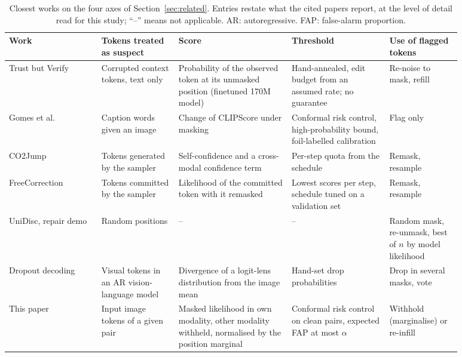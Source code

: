 \begin{table}[t]
\centering
\caption{Closest works on the four axes of Section~\ref{sec:related}. Entries restate what the cited papers report, at the
level of detail read for this study; ``--'' means not applicable. AR: autoregressive. FAP: false-alarm proportion.}
\label{tab:related}
\footnotesize
\setlength{\tabcolsep}{3pt}
\begin{tabular}{p{0.18\linewidth}p{0.15\linewidth}p{0.22\linewidth}p{0.19\linewidth}p{0.14\linewidth}}
\toprule
Work & Tokens treated as suspect & Score & Threshold & Use of flagged tokens \\
\midrule
Trust but Verify \cite{jhingran2026trustverify} & Corrupted context tokens, text only & Probability of the observed token at its unmasked position (finetuned 170M model) & Hand-annealed, edit budget from an assumed rate; no guarantee & Re-noise to mask, refill \\
Gomes et al.~\cite{gomes2025crc} & Caption words given an image & Change of CLIPScore under masking & Conformal risk control, high-probability bound, foil-labelled calibration & Flag only \\
CO2Jump \cite{le2026co2jump} & Tokens generated by the sampler & Self-confidence and a cross-modal confidence term & Per-step quota from the schedule & Remask, resample \\
FreeCorrection \cite{ouyang2026freecorrection} & Tokens committed by the sampler & Likelihood of the committed token with it remasked & Lowest scores per step, schedule tuned on a validation set & Remask, resample \\
UniDisc, repair demo~\cite{swerdlow2025unidisc} & Random positions & -- & -- & Random mask, re-unmask, best of $n$ by model likelihood \\
Dropout decoding~\cite{fang2025dropout} & Visual tokens in an AR vision-language model & Divergence of a logit-lens distribution from the image mean & Hand-set drop probabilities & Drop in several masks, vote \\
\midrule
This paper & Input image tokens of a given pair & Masked likelihood in own modality, other modality withheld, normalised by the position marginal & Conformal risk control on clean pairs, expected FAP at most $\alpha$ & Withhold (marginalise) or re-infill \\
\bottomrule
\end{tabular}
\end{table}

